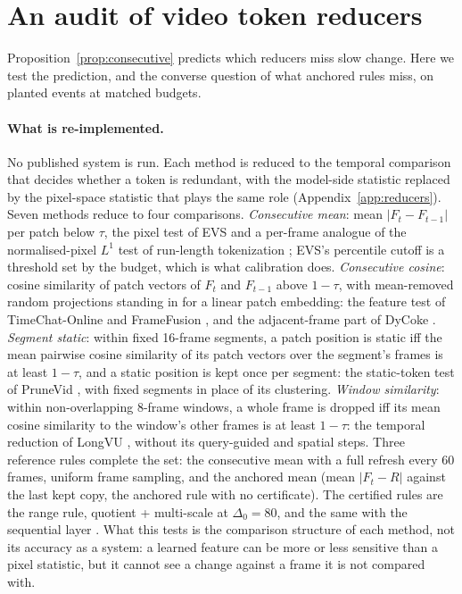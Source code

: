 \section{An audit of video token reducers}
\label{sec:audit}

Proposition~\ref{prop:consecutive} predicts which reducers miss slow change. Here we test the prediction, and the converse question of what anchored rules miss, on planted events at matched budgets.

\paragraph{What is re-implemented.} No published system is run. Each method is reduced to the temporal comparison that decides whether a token is redundant, with the model-side statistic replaced by the pixel-space statistic that plays the same role (Appendix~\ref{app:reducers}). Seven methods reduce to four comparisons. \emph{Consecutive mean}: mean $|F_t - F_{t-1}|$ per patch below $\tau$, the pixel test of EVS \citep{evs2025} and a per-frame analogue of the normalised-pixel $L^1$ test of run-length tokenization \citep{choudhury2024rlt}; EVS's percentile cutoff is a threshold set by the budget, which is what calibration does. \emph{Consecutive cosine}: cosine similarity of patch vectors of $F_t$ and $F_{t-1}$ above $1 - \tau$, with mean-removed random projections standing in for a linear patch embedding: the feature test of TimeChat-Online \citep{yao2025timechatonline} and FrameFusion \citep{fu2024framefusion}, and the adjacent-frame part of DyCoke \citep{tao2025dycoke}. \emph{Segment static}: within fixed 16-frame segments, a patch position is static iff the mean pairwise cosine similarity of its patch vectors over the segment's frames is at least $1 - \tau$, and a static position is kept once per segment: the static-token test of PruneVid \citep{huang2025prunevid}, with fixed segments in place of its clustering. \emph{Window similarity}: within non-overlapping 8-frame windows, a whole frame is dropped iff its mean cosine similarity to the window's other frames is at least $1 - \tau$: the temporal reduction of LongVU \citep{shen2024longvu}, without its query-guided and spatial steps. Three reference rules complete the set: the consecutive mean with a full refresh every 60 frames, uniform frame sampling, and the anchored mean (mean $|F_t - R|$ against the last kept copy, the anchored rule with no certificate). The certified rules are the range rule, quotient + multi-scale at $\Delta_0 = 80$, and the same with the sequential layer \citep{nair2026certifiedskip}. What this tests is the comparison structure of each method, not its accuracy as a system: a learned feature can be more or less sensitive than a pixel statistic, but it cannot see a change against a frame it is not compared with.

